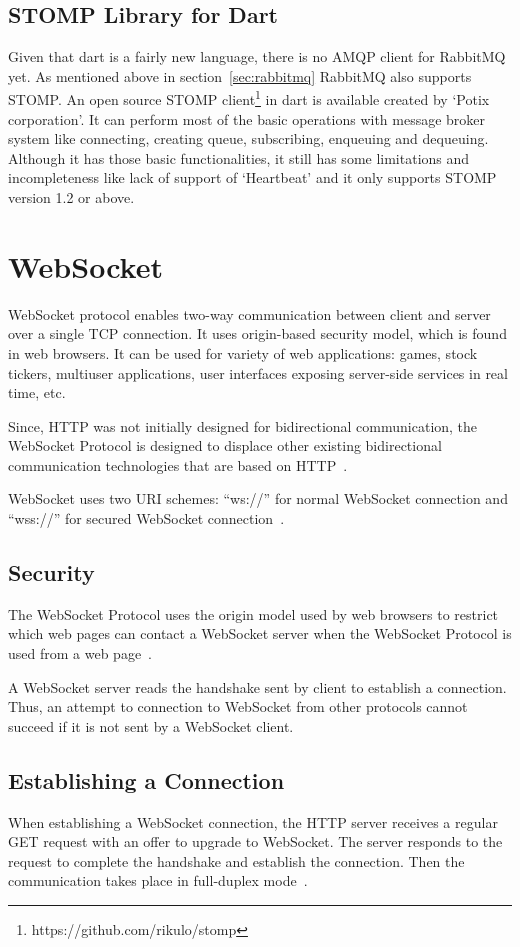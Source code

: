   \subsection{STOMP Library for Dart}
  \label{subsec:stompForDart}
  Given that dart is a fairly new language, there is no AMQP client for RabbitMQ yet. As mentioned above in section~\ref{sec:rabbitmq} RabbitMQ also supports STOMP. An open source STOMP client\footnote{https://github.com/rikulo/stomp} in dart is available created by ‘Potix corporation’. It can perform most of the basic operations with message broker system like connecting, creating queue, subscribing, enqueuing and dequeuing. Although it has those basic functionalities, it still has some limitations and incompleteness like lack of support of ‘Heartbeat’ and it only supports STOMP version 1.2 or above.


\section{WebSocket}
  WebSocket protocol enables two-way communication between client and server over a single TCP connection. It uses origin-based security model, which is found in web browsers. It can be used for variety of web applications: games, stock tickers, multiuser applications, user interfaces exposing server-side services in real time, etc.~\cite{rfc6455}

  Since, HTTP was not initially designed for bidirectional communication, the WebSocket Protocol is designed to displace other existing bidirectional communication technologies that are based on HTTP~\cite{rfc6455}.

  WebSocket uses two URI schemes: “ws://” for normal WebSocket connection and “wss://” for secured WebSocket connection~\cite{rfc6455}.

\subsection{Security}
  The WebSocket Protocol uses the origin model used by web browsers to restrict which web pages can contact a WebSocket server when the WebSocket Protocol is used from a web page~\cite{rfc6455}.

   A WebSocket server reads the handshake sent by client to establish a connection. Thus, an attempt to connection to WebSocket from other protocols cannot succeed if it is not sent by a WebSocket client.~\cite{rfc6455}

\subsection{Establishing a Connection}
  When establishing a WebSocket connection, the HTTP server receives a regular GET request with an offer to upgrade to WebSocket. The server responds to the request to complete the handshake and establish the connection. Then the communication takes place in full-duplex mode~\cite{rfc6455}.
  
